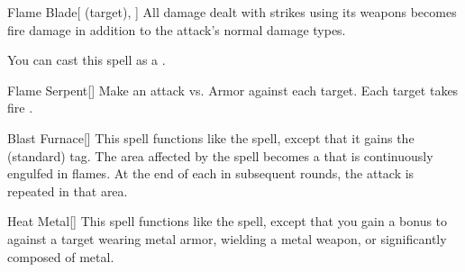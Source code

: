 \lowercase{\hypertarget{spell:Flame Blade}{}}\label{spell:Flame Blade}
\begin{attuneability}[Rank 3]{\hypertarget{spell:Flame Blade}{Flame Blade}}[ (target), ]
All damage dealt with strikes using its weapons becomes fire damage in addition to the attack's normal damage types.

You can cast this spell as a .
\end{attuneability}
\vspace{0.25em}



\lowercase{\hypertarget{spell:Flame Serpent}{}}\label{spell:Flame Serpent}
\begin{freeability}[Rank 3]{\hypertarget{spell:Flame Serpent}{Flame Serpent}}[]
Make an attack vs. Armor against each target.
\hit Each target takes fire .
\end{freeability}
\vspace{0.25em}



\lowercase{\hypertarget{spell:Blast Furnace}{}}\label{spell:Blast Furnace}
\begin{freeability}[Rank 4]{\hypertarget{spell:Blast Furnace}{Blast Furnace}}[]
This spell functions like the  spell, except that it gains the  (standard) tag.
The area affected by the spell becomes a  that is continuously engulfed in flames.
At the end of each  in subsequent rounds, the attack is repeated in that area.
\end{freeability}
\vspace{0.25em}



\lowercase{\hypertarget{spell:Heat Metal}{}}\label{spell:Heat Metal}
\begin{freeability}[Rank 4]{\hypertarget{spell:Heat Metal}{Heat Metal}}[]
This spell functions like the  spell, except that you gain a  bonus to  against a target wearing metal armor, wielding a metal weapon, or significantly composed of metal.
\end{freeability}
\vspace{0.25em}



